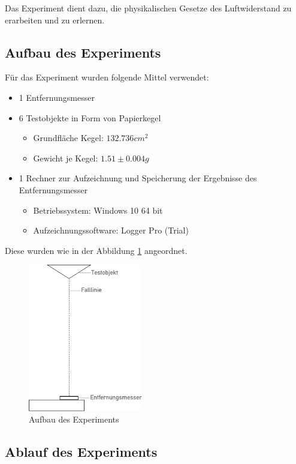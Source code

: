 Das Experiment dient dazu, die physikalischen Gesetze des Luftwiderstand zu erarbeiten und zu erlernen. 

\subsection{Aufbau des Experiments}

Für das Experiment wurden folgende Mittel verwendet:

\begin{itemize}
	\item 1 Entfernungsmesser
	\item 6 Testobjekte in Form von Papierkegel
	\begin{itemize}
		\item Grundfläche Kegel: \(132.736 cm^2\)
		\item Gewicht je Kegel: \(1.51 \pm 0.004g \)
	\end{itemize}
	\item 1 Rechner zur Aufzeichnung und Speicherung der Ergebnisse des Entfernungsmesser
	\begin{itemize}
		\item Betriebssystem: Windows 10 64 bit
		\item Aufzeichnungssoftware: Logger Pro (Trial)
	\end{itemize}
\end{itemize}

Diese wurden wie in der Abbildung \ref{fig:expsetup} angeordnet.



\begin{figure}
	\center
	\includegraphics[width=5cm]{diagrams/experiment_aufbau}\caption{\label{fig:expsetup} Aufbau des Experiments}	
\end{figure}



\subsection{Ablauf des Experiments}


